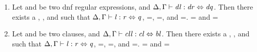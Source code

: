\begin{lemma}\leavevmode
\begin{enumerate}
\item Let \DNFRegex{} and \DNFRegexAlt{} be two dnf regular expressions, and $\Delta, \Gamma \vdash \mathit{dl} : \mathit{dr} \Leftrightarrow \mathit{dq}$.  Then there exists a \Lens{}, \Regex{}, and \RegexAlt{} such that $\Delta, \Gamma \vdash \mathit{l} : \mathit{r} \Leftrightarrow \mathit{q}$, \PutRightOf{\Lens}=\PutRightOf{\DNFLens}, \LanguageOf{\Delta}{\Regex}=\LanguageOf{\Delta}{\DNFRegex}, and \LanguageOf{\Delta}{\RegexAlt}=\LanguageOf{\Delta}{\DNFRegexAlt}.  \LanguageOf{\Delta{}}{\Regex{}} = \LanguageOf{\Delta{}}{\DNFRegex{}} and
\LanguageOf{\Delta{}}{\RegexAlt{}} = \LanguageOf{\Delta{}}{\DNFRegexAlt{}}

\item Let \Clause{} and \ClauseAlt{} be two clauses, and $\Delta, \Gamma \vdash \mathit{cll} : \mathit{cl} \Leftrightarrow \mathit{bl}$.  Then there exists a \Lens{}, \Regex{}, and \RegexAlt{} such that $\Delta, \Gamma \vdash \mathit{l} : \mathit{r} \Leftrightarrow \mathit{q}$, \PutRightOf{\Lens}=\PutRightOf{\ClauseLens}, \LanguageOf{\Delta}{\Regex}=\LanguageOf{\Delta}{\Clause}, and \LanguageOf{\Delta}{\RegexAlt}=\LanguageOf{\Delta}{\ClauseAlt}.  \LanguageOf{\Delta{}}{\Regex{}} = \LanguageOf{\Delta{}}{\Clause{}} and
\LanguageOf{\Delta{}}{\RegexAlt{}} = \LanguageOf{\Delta{}}{\ClauseAlt{}}


\end{enumerate}
\end{lemma}

